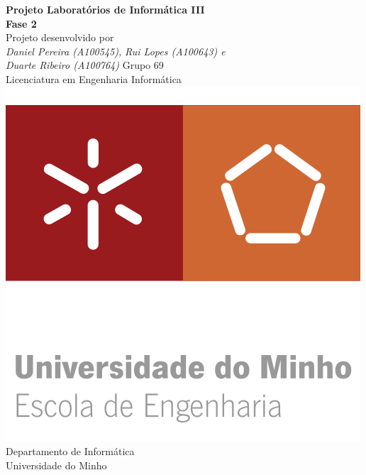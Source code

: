 \documentclass[12pt,a4paper]{report}
\begin{document}
\begin{titlepage}
    {\centering
        {
        \LARGE{\textbf{Projeto Laboratórios de Informática III\\Fase 2}} \\ 
        \vspace*{\fill} 
        {\large{Projeto desenvolvido por}} \\
        \vspace 
        {\Large{\itshape Daniel Pereira (A100545), }{\itshape Rui Lopes (A100643) e \\ }{\itshape Duarte Ribeiro (A100764)}}
        {\small{Grupo 69}}
        \vspace*{\fill} \\
        {\Large Licenciatura em Engenharia Informática} \\
        \vspace*{\fill}
        \includegraphics[scale=1.25]{assets/eeng.png} \\ [0.5cm]
        {\large Departamento de Informática \\ Universidade do Minho} \\
        }
    }
\end{titlepage}

\newpage

    \tableofcontents

\newpage
\end{document}
